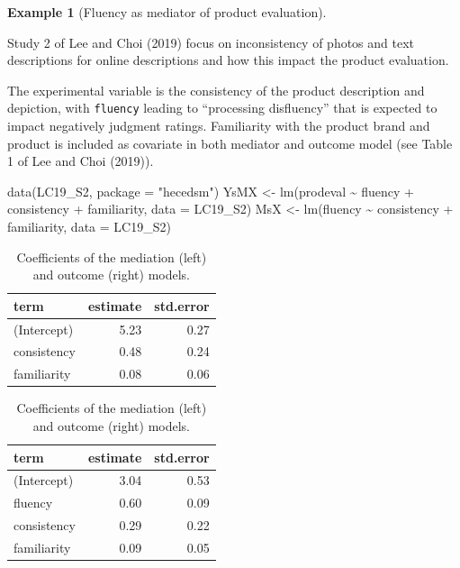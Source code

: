 \documentclass[
  11pt,
  letterpaper,
]{scrbook}
\newenvironment{Shaded}{\begin{snugshade}}{\end{snugshade}}
\newcommand{\AttributeTok}[1]{\textcolor[rgb]{0.40,0.45,0.13}{#1}}
\newcommand{\FunctionTok}[1]{\textcolor[rgb]{0.28,0.35,0.67}{#1}}
\newcommand{\NormalTok}[1]{\textcolor[rgb]{0.00,0.23,0.31}{#1}}
\newcommand{\OtherTok}[1]{\textcolor[rgb]{0.00,0.23,0.31}{#1}}
\newcommand{\SpecialCharTok}[1]{\textcolor[rgb]{0.37,0.37,0.37}{#1}}
\newcommand{\StringTok}[1]{\textcolor[rgb]{0.13,0.47,0.30}{#1}}
\theoremstyle{definition}
\newtheorem{example}{Example}[chapter]
\theoremstyle{remark}
\begin{document}
\begin{example}[Fluency as mediator of product
evaluation]\protect\hypertarget{exm-inconsistency}{}\label{exm-inconsistency}

Study 2 of Lee and Choi (2019) focus on inconsistency of photos and text
descriptions for online descriptions and how this impact the product
evaluation.

The experimental variable is the consistency of the product description
and depiction, with \texttt{fluency} leading to ``processing
disfluency'' that is expected to impact negatively judgment ratings.
Familiarity with the product brand and product is included as covariate
in both mediator and outcome model (see Table 1 of Lee and Choi (2019)).

\begin{Shaded}
\begin{Highlighting}[]
\FunctionTok{data}\NormalTok{(LC19\_S2, }\AttributeTok{package =} \StringTok{"hecedsm"}\NormalTok{)}
\NormalTok{YsMX }\OtherTok{\textless{}{-}} \FunctionTok{lm}\NormalTok{(prodeval }\SpecialCharTok{\textasciitilde{}}\NormalTok{ fluency }\SpecialCharTok{+}\NormalTok{ consistency }\SpecialCharTok{+}\NormalTok{ familiarity,}
           \AttributeTok{data =}\NormalTok{ LC19\_S2)}
\NormalTok{MsX }\OtherTok{\textless{}{-}} \FunctionTok{lm}\NormalTok{(fluency }\SpecialCharTok{\textasciitilde{}}\NormalTok{ consistency }\SpecialCharTok{+}\NormalTok{ familiarity,}
           \AttributeTok{data =}\NormalTok{ LC19\_S2)}
\end{Highlighting}
\end{Shaded}

\hypertarget{tbl-coefsmediation}{}
\begin{table}
\caption{\label{tbl-coefsmediation}Coefficients of the mediation (left) and outcome (right) models. }\tabularnewline


\begin{tabular}{lrr}
\toprule
term & estimate & std.error\\
\midrule
(Intercept) & 5.23 & 0.27\\
consistency & 0.48 & 0.24\\
familiarity & 0.08 & 0.06\\
\bottomrule
\end{tabular}
\begin{tabular}{lrr}
\toprule
term & estimate & std.error\\
\midrule
(Intercept) & 3.04 & 0.53\\
fluency & 0.60 & 0.09\\
consistency & 0.29 & 0.22\\
familiarity & 0.09 & 0.05\\
\bottomrule
\end{tabular}
\end{table}


\end{example}
\end{document}
